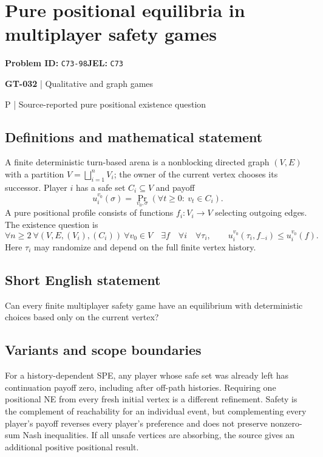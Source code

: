 \documentclass[11pt,a4paper]{article}
\begin{document}
\section*{Pure positional equilibria in multiplayer safety games}
\textbf{Problem ID:} \texttt{C73-98}\quad \textbf{JEL:} \texttt{C73}\par
\label{problem:OP-0162}
\label{game:GT-032}
{\sffamily\small\color{muted}
{\sffamily\small\color{muted}\textbf{GT-032} | Qualitative and graph games\par P | Source-reported pure positional existence question\par}
\par}
\subsection*{Definitions and mathematical statement}
A finite deterministic turn-based arena is a nonblocking directed graph $(V,E)$ with a partition $V=\bigsqcup_{i=1}^{n}V_i$; the owner of the current vertex chooses its successor. Player $i$ has a safe set $C_i\subseteq V$ and payoff
\[
 u_i^{v_0}(\sigma)=\Pr_{v_0,\sigma}(\forall t\geq0:\ v_t\in C_i).
\]
A pure positional profile consists of functions $f_i:V_i\to V$ selecting outgoing edges. The existence question is
\[
 \forall n\geq2\ \forall(V,E,(V_i),(C_i))\ \forall v_0\in V
 \quad\exists f\quad\forall i\quad\forall\tau_i,
 \qquad u_i^{v_0}(\tau_i,f_{-i})\leq u_i^{v_0}(f).
\]
Here $\tau_i$ may randomize and depend on the full finite vertex history.
\subsection*{Short English statement}
Can every finite multiplayer safety game have an equilibrium with deterministic choices based only on the current vertex?
\subsection*{Variants and scope boundaries}
For a history-dependent SPE, any player whose safe set was already left has continuation payoff zero, including after off-path histories. Requiring one positional NE from every fresh initial vertex is a different refinement. Safety is the complement of reachability for an individual event, but complementing every player's payoff reverses every player's preference and does not preserve nonzero-sum Nash inequalities. If all unsafe vertices are absorbing, the source gives an additional positive positional result.
\end{document}
